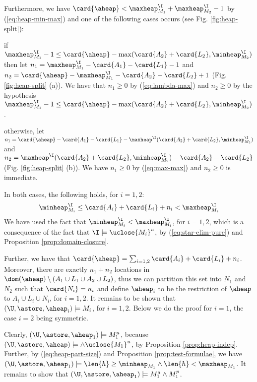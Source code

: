{\begin{figure}[thb]
  \end{figure}  
  Furthermore, we have $\card{\aheap} < \maxheap^\I_{M_1} +
  \maxheap^\I_{M_2} - 1$ by (\ref{eq:heap-min-max}) and one of the
  following cases occurs (see Fig. \ref{fig:heap-split}): \begin{compactenum}
    \item if $\maxheap^\I_{M_1} - 1 \leq \card{\aheap} -
      \max(\card{A_2} + \card{L_2}, \minheap^\I_{M_2})$ then let $n_1
      = \maxheap^\I_{M_1} - \card{A_1} - \card{L_1} - 1$ and $n_2 =
      \card{\aheap} - \maxheap^\I_{M_1} - \card{A_2} - \card{L_2} + 1$
      (Fig. \ref{fig:heap-split} (a)). We have that $n_1 \geq 0$ by
      (\ref{eq:lambda-max}) and $n_2 \geq 0$ by the hypothesis
      $\maxheap^\I_{M_1} - 1 \leq \card{\aheap} - \max(\card{A_2} +
      \card{L_2}, \minheap^\I_{M_2})$.
    \item otherwise, let $n_1 = \card{\aheap} - \card{A_1} - \card{L_1}
      - \maxheap^\I(\card{A_2} + \card{L_2},\minheap^\I_{M_2})$ and
      $n_2 = \maxheap^\I(\card{A_2} + \card{L_2},\minheap^\I_{M_2}) -
      \card{A_2} - \card{L_2}$ (Fig. \ref{fig:heap-split} (b)). We
      have $n_1 \geq 0$ by (\ref{eq:max-max}) and $n_2 \geq 0$ is
      immediate.
  \end{compactenum}
  In both cases, the following holds, for $i = 1,2$:
  \begin{equation}\label{eq:heap-part-size}
    \minheap^\I_{M_i} \leq \card{A_i} + \card{L_i} + n_i < \maxheap^\I_{M_i}
  \end{equation}
  We have used the fact that $\minheap^\I_{M_i} < \maxheap^\I_{M_i}$,
  for $i=1,2$, which is a consequence of the fact that $\I \models
  \uclose{M_i}^u$, by (\ref{eq:star-elim-pure}) and Proposition
  \ref{prop:domain-closure}. 

  Further, we have that $\card{\aheap} = \sum_{i=1,2} \card{A_i} +
  \card{L_i} + n_i$. Moreover, there are exactly $n_1 + n_2$ locations
  in $\dom(\aheap) \setminus (A_1 \cup L_1 \cup A_2 \cup L_2)$, thus
  we can partition this set into $N_1$ and $N_2$ such that $\card{N_i}
  = n_i$ and define $\aheap_i$ to be the restriction of $\aheap$ to
  $A_i \cup L_i \cup N_i$, for $i = 1,2$. It remains to be shown that
  $(\U,\astore,\aheap_i) \models M_i$, for $i=1,2$. Below we do the
  proof for $i=1$, the case $i=2$ being symmetric.

  Clearly, $(\U,\astore,\aheap_1) \models %
  M_1^u$, because $(\U,\astore,\aheap) \models %
  \wedge \uclose{M_1}^u$, by Proposition
  \ref{prop:heap-indep}. Further, by (\ref{eq:heap-part-size}) and
  Proposition \ref{prop:test-formulae}, we have $(\U,\astore,\aheap_1)
  \models \len{h} \geq \minheap_{M_1} \wedge \len{h} <
  \maxheap_{M_1}$. It remains to show that $(\U,\astore,\aheap_1)
  \models M_1^a \wedge M_1^p$.

}
